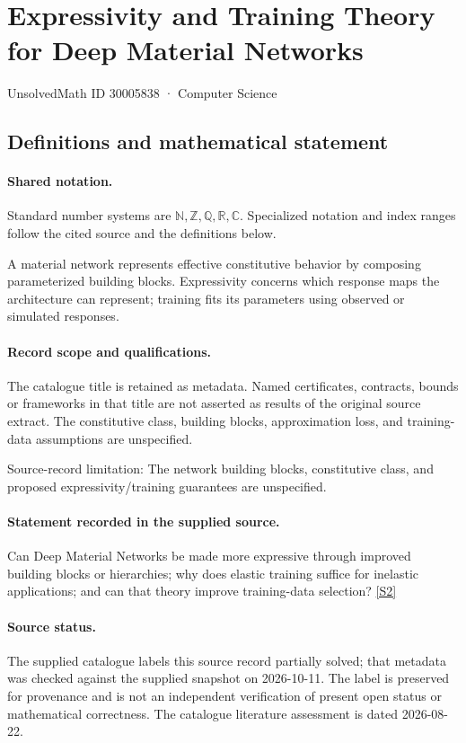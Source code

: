 \documentclass[11pt]{article}
\newcommand{\sref}[2]{\hyperlink{source:#1:#2}{[S#2]}}
\begin{document}
\setcounter{section}{30005837}
\section{Expressivity and Training Theory for Deep Material Networks}\label{30005838}
{\small\sffamily UnsolvedMath ID 30005838 · Computer Science}
\subsection{Definitions and mathematical statement}

\paragraph{Shared notation.}Standard number systems are $\mathbb N,\mathbb Z,\mathbb Q,\mathbb R,\mathbb C$. Specialized notation and index ranges follow the cited source and the definitions below.


A material network represents effective constitutive behavior by composing parameterized building blocks. Expressivity concerns which response maps the architecture can represent; training fits its parameters using observed or simulated responses.
\paragraph{Record scope and qualifications.}
The catalogue title is retained as metadata. Named certificates, contracts, bounds or frameworks in that title are not asserted as results of the original source extract.
The constitutive class, building blocks, approximation loss, and training-data assumptions are unspecified.

Source-record limitation: The network building blocks, constitutive class, and proposed expressivity/training guarantees are unspecified.
\paragraph{Statement recorded in the supplied source.}
Can Deep Material Networks be made more expressive through improved building blocks or hierarchies; why does elastic training suffice for inelastic applications; and can that theory improve training-data selection? \sref{30005838}{2}
\paragraph{Source status.}
The supplied catalogue labels this source record partially solved; that metadata was checked against the supplied snapshot on 2026-10-11. The label is preserved for provenance and is not an independent verification of present open status or mathematical correctness. The catalogue literature assessment is dated 2026-08-22.
\end{document}
